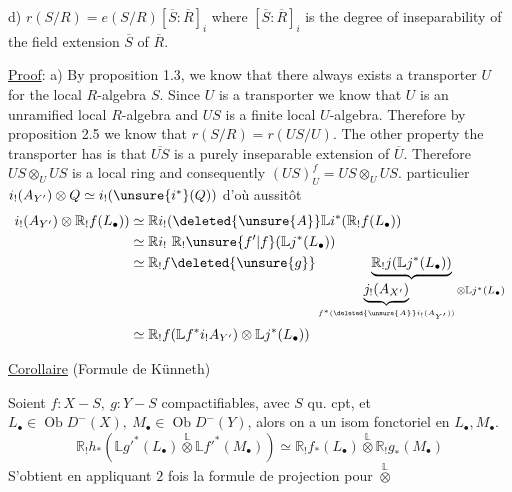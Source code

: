 d) $r(S/R)=e(S/R)[\overline S:\overline R]_i$ where $[\overline S:\overline R]_i$ is the degree of inseparability
of the field extension $\overline S$ of $\overline R$.

\uline{Proof}: a) By proposition 1.3, we know that there always exists a
transporter $U$ for the local $R$-algebra $S$. Since $U$ is a transporter we know
that $U$ is an unramified local $R$-algebra and $US$ is a finite local $U$-algebra.
Therefore by proposition 2.5 we know that $r(S/R)=r(US/U)$. The other
property the transporter has is that $\overline{US}$ is a purely inseparable extension
of $\overline U$. Therefore $US\otimes_U US$ is a local ring and consequently $(US)_U^f=US\otimes_U US$.
particulier $i_!(A_{Y'})\otimes Q\simeq i_!(\unsure{i^*}(Q))$ d'où aussitôt
\[
\begin{aligned}
i_!(A_{Y'})\otimes\mathbb R_!f(L_\bullet))
&\simeq\mathbb Ri_!(\deleted{\unsure{A}}\mathbb Li^*(\mathbb R_!f(L_\bullet))\\
&\simeq\mathbb Ri_!\ \mathbb R_!\unsure{f'|f}(\mathbb Lj^*(L_\bullet))\\
&\simeq\mathbb R_!f\deleted{\unsure{g}}
\underbrace{\mathbb R_!j(\mathbb Lj^*(L_\bullet))}_{
\underbrace{j_!(A_{X'})}_{f^*(\deleted{\unsure{A}}i_!(A_{Y'}))}\otimes\mathbb Lj^*(L_\bullet)}\\
&\simeq\mathbb R_!f(\mathbb Lf^*i_!A_{Y'})\otimes\mathbb Lj^*(L_\bullet))
\end{aligned}
\]

\uline{Corollaire} (Formule de Künneth)

Soient $f:X-S,\ g:Y-S$ compactifiables, avec
$S$ qu. cpt, et $L_\bullet\in\operatorname{Ob}D^-(X),\ M_\bullet\in\operatorname{Ob}D^-(Y)$,
alors on a un isom fonctoriel en $L_\bullet,M_\bullet$.
\[
\boxed{\mathbb R_!h_*(\mathbb Lg'^*(L_\bullet)\overset{\mathbb L}{\otimes}\mathbb Lf'^*(M_\bullet))
\simeq\mathbb R_!f_*(L_\bullet)\overset{\mathbb L}{\otimes}\mathbb R_!g_*(M_\bullet)}
\]
S'obtient en appliquant $2$ fois la formule
de projection pour $\overset{\mathbb L}{\otimes}$

